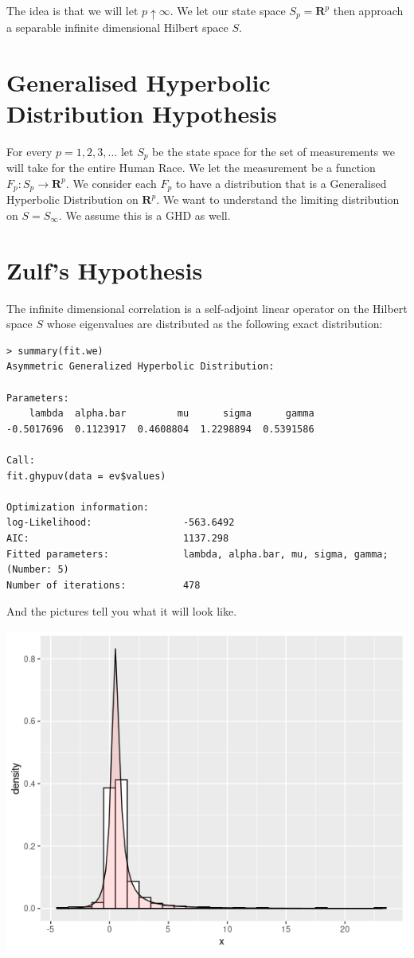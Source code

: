 \documentclass{amsart}
\begin{document}
The idea is that we will let $p \uparrow \infty$.  We let our state space $S_p = \mathbf{R}^p$ then approach a separable infinite dimensional Hilbert space $S$.

\section{Generalised Hyperbolic Distribution Hypothesis}

For every $p=1,2,3,\dots$ let $S_p$ be the state space for the set of measurements we will take for the entire Human Race.  We let the measurement be a function $F_p: S_p \rightarrow \mathbf{R}^p$.  We consider each $F_p$ to have a distribution that is a Generalised Hyperbolic Distribution on $\mathbf{R}^p$.  We want to understand the limiting distribution on $S=S_{\infty}$.  We assume this is a GHD as well.  

\section{Zulf's Hypothesis}

The infinite dimensional correlation is a self-adjoint linear operator on the Hilbert space $S$ whose eigenvalues are distributed as the following exact distribution:

\begin{verbatim}
> summary(fit.we)
Asymmetric Generalized Hyperbolic Distribution:

Parameters:
    lambda  alpha.bar         mu      sigma      gamma 
-0.5017696  0.1123917  0.4608804  1.2298894  0.5391586 

Call:
fit.ghypuv(data = ev$values)

Optimization information:
log-Likelihood:                -563.6492 
AIC:                           1137.298 
Fitted parameters:             lambda, alpha.bar, mu, sigma, gamma;  (Number: 5)
Number of iterations:          478 
\end{verbatim} 

And the pictures tell you what it will look like.

\includegraphics[scale=1.0]{wveig.png}
\end{document}
